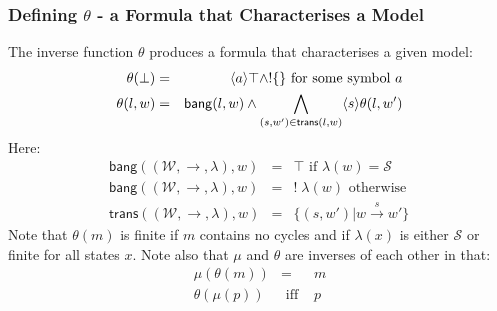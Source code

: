 \subsubsection{Defining $\theta$ - a Formula that Characterises a Model}
The inverse function $\theta$ produces a formula that characterises a given  model:
\begin{eqnarray}
\theta(\bot) & = & \langle a \rangle \top \land ! \{ \} \mbox{ for some symbol }a \nonumber \\
\theta(l, w) & = & \mathsf{bang}(l,w) \land \bigwedge_{(s,w') \in \mathsf{trans}(l,w)} \langle s \rangle \theta(l, w') \nonumber 
\end{eqnarray}
Here:
\begin{eqnarray}
\mathsf{bang}((\mathcal{W},\rightarrow,\lambda),w) & = & \top \mbox{ if } \lambda(w) = \mathcal{S} \nonumber \\
\mathsf{bang}((\mathcal{W},\rightarrow,\lambda),w) & = & ! \; \lambda(w) \mbox{ otherwise } \nonumber \\
\mathsf{trans}((\mathcal{W},\rightarrow, \lambda),w) & = & \{(s,w') | w \xrightarrow{s} w' \} \nonumber
\end{eqnarray}
Note that $\theta(m)$ is finite if $m$ contains no cycles and if $\lambda(x)$ is either $\mathcal{S}$ or finite for all states $x$.
Note also that $\mu$ and $\theta$ are inverses of each other in that:
\begin{eqnarray}
\mu(\theta(m)) & = & m \nonumber \\
\theta(\mu(p)) & \mbox{ iff } & p \nonumber
\end{eqnarray}


